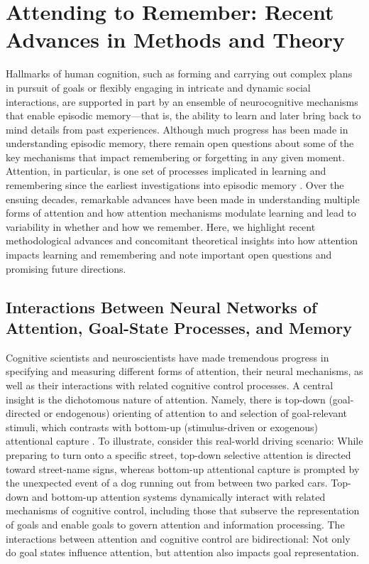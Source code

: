 \chapter{Attending to Remember: Recent Advances in Methods and Theory}\label{ch:attending-to-remember}

Hallmarks of human cognition, such as forming and carrying out complex plans in pursuit of goals or flexibly engaging in intricate and dynamic social interactions, are supported in part by an ensemble of neurocognitive mechanisms that enable episodic memory—that is, the ability to learn and later bring back to mind details from past experiences. Although much progress has been made in understanding episodic memory, there remain open questions about some of the key mechanisms that impact remembering or forgetting in any given moment. Attention, in particular, is one set of processes implicated in learning and remembering since the earliest investigations into episodic memory \parencite{ebbinghaus1885memory}. Over the ensuing decades, remarkable advances have been made in understanding multiple forms of attention and how attention mechanisms modulate learning and lead to variability in whether and how we remember. Here, we highlight recent methodological advances and concomitant theoretical insights into how attention impacts learning and remembering and note important open questions and promising future directions.

\section{Interactions Between Neural Networks of Attention, Goal-State Processes, and Memory}

Cognitive scientists and neuroscientists have made tremendous progress in specifying and measuring different forms of attention, their neural mechanisms, as well as their interactions with related cognitive control processes. A central insight is the dichotomous nature of attention. Namely, there is top-down (goal-directed or endogenous) orienting of attention to and selection of goal-relevant stimuli, which contrasts with bottom-up (stimulus-driven or exogenous) attentional capture \parencite[e.g.,][]{corbetta2002control,posner1990attention}. To illustrate, consider this real-world driving scenario: While preparing to turn onto a specific street, top-down selective attention is directed toward street-name signs, whereas bottom-up attentional capture is prompted by the unexpected event of a dog running out from between two parked cars. Top-down and bottom-up attention systems dynamically interact with related mechanisms of cognitive control, including those that subserve the representation of goals and enable goals to govern attention and information processing. The interactions between attention and cognitive control are bidirectional: Not only do goal states influence attention, but attention also impacts goal representation.

